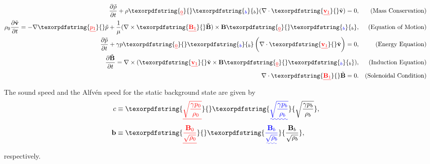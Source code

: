 \documentclass[a4paper,12pt,fourier,authoryear,custommargin]{Classes/PhDThesisPSnPDF}
\renewcommand{\vec}{\mathbf}
\providecommand{\DIFaddtex}[1]{{\protect\color{blue}\uwave{#1}}} %
\providecommand{\DIFdeltex}[1]{{\protect\color{red}\sout{#1}}}                      %
\providecommand{\DIFaddbegin}{} %
\providecommand{\DIFaddend}{} %
\providecommand{\DIFdelbegin}{} %
\providecommand{\DIFdelend}{} %
\providecommand{\DIFadd}[1]{\texorpdfstring{\DIFaddtex{#1}}{#1}} %
\providecommand{\DIFdel}[1]{\texorpdfstring{\DIFdeltex{#1}}{}} %
\begin{document}
\begin{align}                                                         
    \DIFdelbegin %
\DIFdelend \DIFaddbegin \dfrac{\partial \tilde{\rho} }{\partial t} \DIFaddend + \rho\DIFdelbegin \DIFdel{_0 }\DIFdelend \DIFaddbegin \DIFadd{_b }\DIFaddend (\nabla \cdot \DIFdelbegin \DIFdel{\vec{v}_1}\DIFdelend \DIFaddbegin \tilde{\vec{v}}\DIFaddend ) =       
    0,
    &&\text{(Mass Conservation)}\label{eq:lmhd_mass}\\
    \rho_0 \DIFdelbegin %
\DIFdelend \DIFaddbegin \dfrac{\partial \tilde{\vec{v}}}{\partial t} \DIFaddend =
    -\nabla \DIFdelbegin \DIFdel{p_1 }\DIFdelend \DIFaddbegin \tilde{p} \DIFaddend + \dfrac{1}{\mu}(\nabla \times \DIFdelbegin \DIFdel{\vec{B}_1}\DIFdelend \DIFaddbegin \tilde{\vec{B}}\DIFaddend ) \times \vec{B}\DIFdelbegin \DIFdel{_0}\DIFdelend \DIFaddbegin \DIFadd{_b}\DIFaddend ,
    &&\text{(Equation of Motion)}\label{eq:lmhd_motion}\\
    \DIFdelbegin %
\DIFdelend \DIFaddbegin \dfrac{\partial \tilde{p}}{\partial t} \DIFaddend + \gamma p\DIFdelbegin \DIFdel{_0 }\DIFdelend \DIFaddbegin \DIFadd{_b }\DIFaddend \left( \nabla \cdot \DIFdelbegin \DIFdel{\vec{v}_1 }\DIFdelend \DIFaddbegin \tilde{\vec{v}} \DIFaddend \right) = 0,
    &&\text{(Energy Equation)}\label{eq:lmhd_energy}\\
    \DIFdelbegin %
\DIFdelend \DIFaddbegin \dfrac{\partial \tilde{\vec{B}}}{\partial t} \DIFaddend = \nabla \times (\DIFdelbegin \DIFdel{\vec{v}_1 }\DIFdelend \DIFaddbegin \tilde{\vec{v}} \DIFaddend \times \vec{B}\DIFdelbegin \DIFdel{_0}\DIFdelend \DIFaddbegin \DIFadd{_b}\DIFaddend ),
    &&\text{(Induction Equation)}\label{eq:lmhd_induction}\\
    \nabla \cdot \DIFdelbegin \DIFdel{\vec{B}_1 }\DIFdelend \DIFaddbegin \tilde{\vec{B}} \DIFaddend = 0.
    &&\text{(Solenoidal Condition)}\label{eq:lmhd_solenoid}              
\end{align}
The sound speed and the Alfv\'en speed for the static background state are given by 
\begin{align}
    c &\equiv \DIFdelbegin \DIFdel{\sqrt{\frac{\gamma p_0}{\rho_0}}}\DIFdelend \DIFaddbegin \DIFadd{\sqrt{\frac{\gamma p_b}{\rho_b}}}\DIFaddend ,\label{eq:soundspeed}\\
    \vec{b} &\equiv \DIFdelbegin \DIFdel{\frac{\vec{B}_0}{\sqrt{\rho_0}}}\DIFdelend \DIFaddbegin \DIFadd{\frac{\vec{B}_b}{\sqrt{\rho_b}}}\DIFaddend ,\label{eq:alfvenspeed}
\end{align}
respectively.
\end{document}
